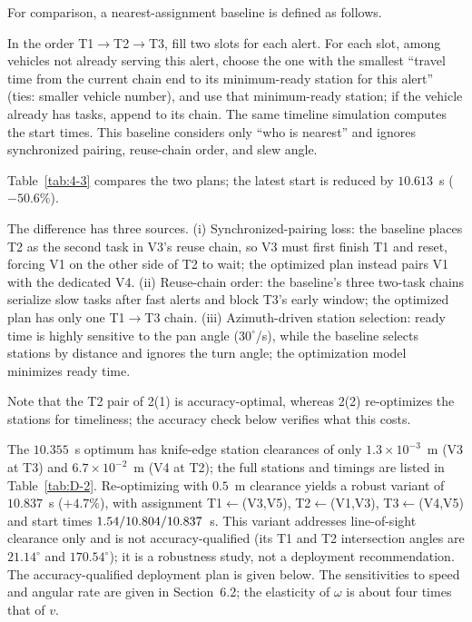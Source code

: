 For comparison, a nearest-assignment baseline is defined as follows.

In the order T1$\to$T2$\to$T3, fill two slots for each alert. For each slot, among vehicles not already serving this alert, choose the one with the smallest ``travel time from the current chain end to its minimum-ready station for this alert'' (ties: smaller vehicle number), and use that minimum-ready station; if the vehicle already has tasks, append to its chain. The same timeline simulation computes the start times. This baseline considers only ``who is nearest'' and ignores synchronized pairing, reuse-chain order, and slew angle.

Table~\ref{tab:4-3} compares the two plans; the latest start is reduced by $10.613$~s ($-50.6\%$).

The difference has three sources. (i) Synchronized-pairing loss: the baseline places T2 as the second task in V3's reuse chain, so V3 must first finish T1 and reset, forcing V1 on the other side of T2 to wait; the optimized plan instead pairs V1 with the dedicated V4. (ii) Reuse-chain order: the baseline's three two-task chains serialize slow tasks after fast alerts and block T3's early window; the optimized plan has only one T1$\to$T3 chain. (iii) Azimuth-driven station selection: ready time is highly sensitive to the pan angle ($30^\circ$/s), while the baseline selects stations by distance and ignores the turn angle; the optimization model minimizes ready time.

Note that the T2 pair of 2(1) is accuracy-optimal, whereas 2(2) re-optimizes the stations for timeliness; the accuracy check below verifies what this costs.

The $10.355$~s optimum has knife-edge station clearances of only $1.3\times10^{-3}$~m (V3 at T3) and $6.7\times10^{-2}$~m (V4 at T2); the full stations and timings are listed in Table~\ref{tab:D-2}. Re-optimizing with $0.5$~m clearance yields a robust variant of $10.837$~s ($+4.7\%$), with assignment T1$\leftarrow$(V3,V5), T2$\leftarrow$(V1,V3), T3$\leftarrow$(V4,V5) and start times $1.54/\allowbreak10.804/\allowbreak10.837$~s. This variant addresses line-of-sight clearance only and is not accuracy-qualified (its T1 and T2 intersection angles are $21.14^\circ$ and $170.54^\circ$); it is a robustness study, not a deployment recommendation. The accuracy-qualified deployment plan is given below. The sensitivities to speed and angular rate are given in Section~6.2; the elasticity of $\omega$ is about four times that of $v$.

